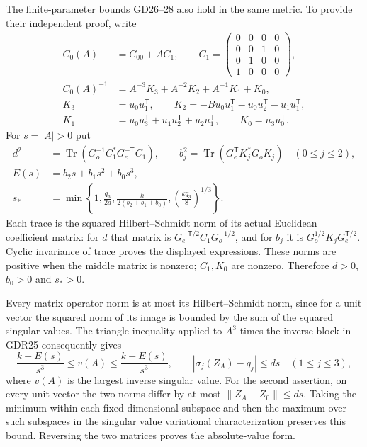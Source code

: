 \documentclass[10pt]{article}
\newcommand{\Tr}{\operatorname{Tr}}
\begin{document}
The finite-parameter bounds GD26--28 also hold in the same
metric. To provide their independent proof, write
\begin{equation}
 \begin{aligned}
 C_0(A)&=C_{00}+AC_1,\qquad
 C_1=\begin{pmatrix}0&0&0&0\\0&0&1&0\\0&1&0&0\\1&0&0&0\end{pmatrix},\\
 C_0(A)^{-1}&=A^{-3}K_3+A^{-2}K_2+A^{-1}K_1+K_0,\\
 K_3&=u_0u_1^{\mathsf T},\qquad
 K_2=-Bu_0u_1^{\mathsf T}-u_0u_2^{\mathsf T}-u_1u_1^{\mathsf T},\\
 K_1&=u_0u_3^{\mathsf T}+u_1u_2^{\mathsf T}+u_2u_1^{\mathsf T},
 \qquad K_0=u_3u_0^{\mathsf T}.
 \end{aligned}
 \tag{GDR28}
\end{equation}
For $s=|A|>0$ put
\begin{equation}
 \begin{aligned}
 d^2&=\Tr(G_o^{-1}C_1^*G_e^{-\mathsf T}C_1),\qquad
 b_j^2=\Tr(G_e^{\mathsf T}K_j^*G_oK_j)\quad(0\le j\le2),\\
 E(s)&=b_2s+b_1s^2+b_0s^3,\\
 s_*&=\min\left\{1,\frac{q_3}{2d},
 \frac{k}{2(b_2+b_1+b_0)},
 \left(\frac{kq_3}{8}\right)^{1/3}\right\}.
 \end{aligned}
 \tag{GDR29}
\end{equation}
Each trace is the squared Hilbert--Schmidt norm of its
actual Euclidean coefficient matrix: for $d$ that matrix
is $G_e^{-\mathsf T/2}C_1G_o^{-1/2}$, and for $b_j$ it
is $G_o^{1/2}K_jG_e^{\mathsf T/2}$. Cyclic invariance of
trace proves the displayed expressions. These norms are
positive when the middle matrix is nonzero; $C_1,K_0$ are
nonzero. Therefore $d>0$, $b_0>0$ and $s_*>0$.

Every matrix operator norm is at most its Hilbert--Schmidt
norm, since for a unit vector the squared norm of its image
is bounded by the sum of the squared singular values.
The triangle inequality applied to $A^3$ times the inverse
block in GDR25 consequently gives
\[
 \frac{k-E(s)}{s^3}\le v(A)\le\frac{k+E(s)}{s^3},
 \qquad |\sigma_j(Z_A)-q_j|\le ds\quad(1\le j\le3),
\]
where $v(A)$ is the largest inverse singular value.
For the second assertion, on every unit vector the two
norms differ by at most $\|Z_A-Z_0\|\le ds$. Taking
the minimum within each fixed-dimensional subspace and
then the maximum over such subspaces in the singular
value variational characterization preserves this bound.
Reversing the two matrices proves the absolute-value form.
\end{document}
